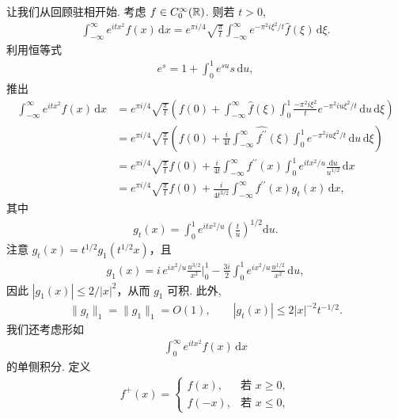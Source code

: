 让我们从回顾驻相开始. 考虑 $f \in C_0^\infty(\mathbb{R})$. 则若 $t > 0$,
\begin{align*}
  \int_{-\infty}^{\infty}e^{i t x^{2}}f(x)\,\mathrm{d}x
  =e^{\pi i/4}\sqrt{\frac{\pi}{t}}\int_{-\infty}^{\infty}e^{-\pi^{2}i\xi^{2}/t}\widehat{f}(\xi)\,\mathrm{d}\xi.
\end{align*}
利用恒等式
\begin{align*}
  e^{s}=1+\int_{0}^{1}e^{su}s\,\mathrm{d}u,
\end{align*}
推出
\begin{equation}\label{eq:9.4}
  \begin{aligned}
  \int_{-\infty}^{\infty}e^{itx^{2}}f(x)\,\mathrm{d}x
  &=e^{\pi i/4}\sqrt{\frac{\pi}{t}}\left(f(0)+\int_{-\infty}^{\infty}\widehat{f}(\xi)
   \int_{0}^{1}\frac{-\pi^{2}i\xi^{2}}{t}e^{-\pi^{2}iu\xi^{2}/t}\,\mathrm{d}u\,\mathrm{d}\xi\right)\\
  &=e^{\pi i/4}\sqrt{\frac{\pi}{t}}\left(f(0)+\frac{i}{4t}\int_{-\infty}^{\infty}\widehat{f^{\prime\prime}}(\xi)
   \int_{0}^{1}e^{-\pi^{2}iu\xi^{2}/t}\,\mathrm{d}u\,\mathrm{d}\xi\right)\\
  &=e^{\pi i/4}\sqrt{\frac{\pi}{t}}f(0)+\frac{i}{4t}\int_{-\infty}^{\infty}f^{\prime\prime}(x)
   \int_{0}^{1}e^{itx^{2}/u}\frac{\mathrm{d}u}{u^{1/2}}\,\mathrm{d}x\\
  &=e^{\pi i/4}\sqrt{\frac{\pi}{t}}f(0)+\frac{i}{4t^{3/2}}\int_{-\infty}^{\infty}f^{\prime\prime}(x)g_{t}(x)\,\mathrm{d}x,
  \end{aligned}
\end{equation}
其中
\begin{align*}
  g_{t}(x)=\int_{0}^{1}e^{itx^{2}/u}\left(\frac{t}{u}\right)^{1/2}\mathrm{d}u.
\end{align*}
注意 $g_{t}(x)=t^{1/2}g_{1}(t^{1/2}x)$，且
\begin{align*}
  g_{1}(x)=i\,e^{i x^{2}/u}\frac{u^{3/2}}{x^{2}}\Big|_{0}^{1}-\frac{3i}{2}\int_{0}^{1}e^{i x^{2}/u}\frac{u^{1/2}}{x^{2}}\,\mathrm{d}u,
\end{align*}
因此 $|g_1(x)| \leq 2/|x|^2$，从而 $g_1$ 可积. 此外,
\begin{align*}
  \|g_{t}\|_{1}=\|g_{1}\|_{1}=O(1),\qquad
  |g_{t}(x)|\leq 2|x|^{-2}t^{-1/2}.
\end{align*}
我们还考虑形如
\begin{align*}
  \int_{0}^{\infty}e^{itx^{2}}f(x)\,\mathrm{d}x
\end{align*}
的单侧积分. 定义
\begin{align*}
  f^{+}(x)=\begin{cases}
    f(x), & \text{若 } x\geq 0,\\
    f(-x), & \text{若 } x\leq 0,
  \end{cases}
\end{align*}
